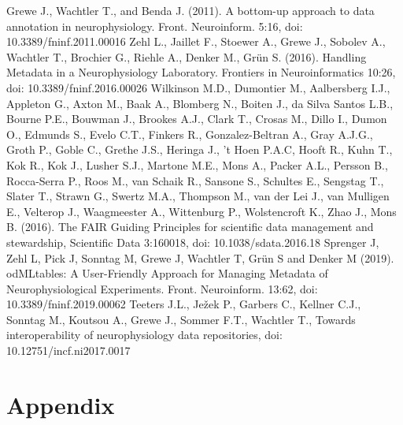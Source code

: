 \documentclass{article}
\begin{document}
\begin{thebibliography}{}
Grewe J., Wachtler T., and Benda J. (2011). A bottom-up approach to data annotation in neurophysiology. Front. Neuroinform. 5:16, doi: 10.3389/fninf.2011.00016
Zehl L., Jaillet F., Stoewer A., Grewe J., Sobolev A., Wachtler T., Brochier G., Riehle A., Denker M., Grün S. (2016). Handling Metadata in a Neurophysiology Laboratory. Frontiers in Neuroinformatics 10:26, doi: 10.3389/fninf.2016.00026
Wilkinson M.D., Dumontier M., Aalbersberg I.J., Appleton G., Axton M., Baak A., Blomberg N., Boiten J., da Silva Santos L.B., Bourne P.E., Bouwman J., Brookes A.J., Clark T., Crosas M., Dillo I., Dumon O., Edmunds S., Evelo C.T., Finkers R., Gonzalez-Beltran A., Gray A.J.G., Groth P., Goble C., Grethe J.S., Heringa J., ’t Hoen P.A.C, Hooft R., Kuhn T., Kok R., Kok J., Lusher S.J., Martone M.E., Mons A., Packer A.L., Persson B., Rocca-Serra P., Roos M., van Schaik R., Sansone S., Schultes E., Sengstag T., Slater T., Strawn G., Swertz M.A., Thompson M., van der Lei J., van Mulligen E., Velterop J., Waagmeester A., Wittenburg P., Wolstencroft K., Zhao J., Mons B. (2016). The FAIR Guiding Principles for scientific data management and stewardship, Scientific Data 3:160018, doi: 10.1038/sdata.2016.18
Sprenger J, Zehl L, Pick J, Sonntag M, Grewe J, Wachtler T, Grün S and Denker M (2019). odMLtables: A User-Friendly Approach for Managing Metadata of Neurophysiological Experiments. Front. Neuroinform. 13:62, doi: 10.3389/fninf.2019.00062
Teeters J.L., Ježek P., Garbers C., Kellner C.J., Sonntag M., Koutsou A., Grewe J., Sommer F.T., Wachtler T., Towards interoperability of neurophysiology data repositories, doi: 10.12751/incf.ni2017.0017
\end{thebibliography}

\section{Appendix} \label{sec:appendix}


\end{document}
